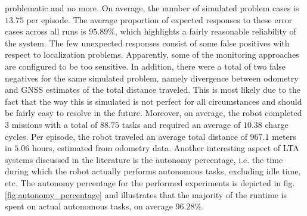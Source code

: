 \documentclass[english, master, utf8]{base/thesis_KBS}
\begin{document}
problematic and no more. 
On average, the number of simulated problem cases is $13.75$ per episode. The average proportion of expected responses to these error cases across all runs is
$95.89\%$, which highlights a fairly reasonable reliability of the system. The few unexpected responses consist of some false positives with respect to localization problems.
Apparently, some of the monitoring approaches are configured to be too sensitive. In addition, there were a total of two false negatives for the same simulated problem, namely
divergence between odometry and GNSS estimates of the total distance traveled. This is most likely due to the fact that the way this is simulated is not perfect for all circumstances
and should be fairly easy to resolve in the future. Moreover, on average, the robot completed $3$ missions with a total of $88.75$ tasks and required an average of
$10.38$ charge cycles. Per episode, the robot traveled an average total distance of $967.1$ meters in $5.06$ hours, estimated from odometry data. Another interesting aspect of LTA systems
discussed in the literature is the autonomy percentage, i.e. the time during which the robot actually performs autonomous tasks, excluding idle time, etc. The autonomy percentage for
the performed experiments is depicted in fig. \ref{fig:autonomy_percentage} and illustrates that the majority of the runtime is spent on actual autonomous tasks, on average $96.28\%$.
\end{document}
